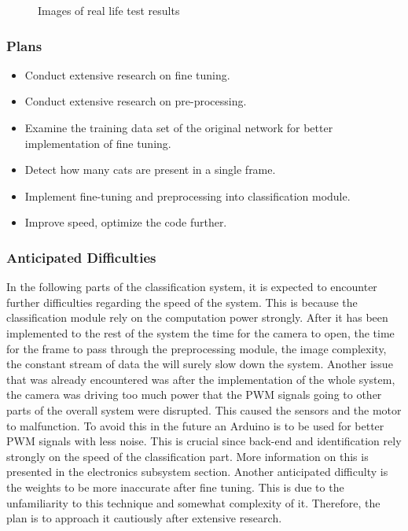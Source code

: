\begin{figure}[ht!]
\begin{subfigure}[c]{0.49\textwidth}
     \caption {}
     \label{fig:catbowl3}
     \end{subfigure}      
     \caption{Images of real life  test results}
     \label{fig:catbowl}
\end{figure}




\subsubsection{Plans}

\begin{itemize}
    \item Conduct extensive research on fine tuning. 
    \item Conduct extensive research on pre-processing. 
    \item Examine the training data set of the original network for better implementation of fine tuning. 
    \item Detect how many cats are present in a single frame. 
    \item Implement fine-tuning and preprocessing into classification module. 
    \item Improve speed, optimize the code further. 
\end{itemize}


\subsubsection{Anticipated Difficulties}

In the following parts of the classification system, it is expected to encounter further difficulties regarding the speed of the system. This is because the classification module rely on the computation power strongly. After it has been implemented to the rest of the system the time for the camera to open, the time for the frame to pass through the preprocessing module, the image complexity, the constant stream of data the will surely slow down the system. Another issue that was already encountered was after the implementation of the whole system, the camera was driving too much power that the PWM signals going to other parts of the overall system were disrupted. This caused the sensors and the motor to malfunction. To avoid this in the future an Arduino is to be used for better PWM signals with less noise. This is crucial since back-end and identification rely strongly on the speed of the classification part. More information on this is presented in the electronics subsystem section. Another anticipated difficulty is the weights to be more inaccurate after fine tuning. This is due to the unfamiliarity to this technique and somewhat complexity of it. Therefore, the plan is to approach it cautiously after extensive research. 


